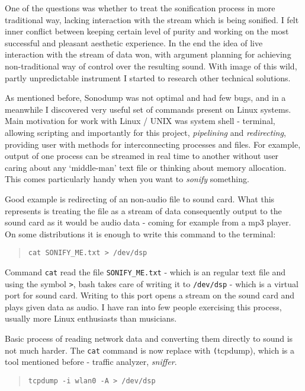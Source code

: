 \documentclass[11pt,a4paper,oneside]{report}
\begin{document}
One of the questions was whether to treat the sonification process in more traditional way, lacking interaction with the stream which is being sonified. I felt inner conflict between keeping certain level of purity and working on the most successful and pleasant aesthetic experience. In the end the idea of live interaction with the stream of data won, with argument planning for achieving non-traditional way of control over the resulting sound. With image of this wild, partly unpredictable instrument I started to research other technical solutions.

As mentioned before, Sonodump was not optimal and had few bugs, and in a meanwhile I discovered very useful set of commands present on Linux systems. Main motivation for work with Linux / UNIX was system shell - terminal, allowing scripting and importantly for this project, \emph{pipelining} and \emph{redirecting}, providing user with methods for interconnecting processes and files. For example, output of one process can be streamed in real time to another without user caring about any `middle-man' text file or thinking about memory allocation. This comes particularly handy when you want to \emph{sonify} something. 

Good example is redirecting of an non-audio file to sound card. What this represents is treating the file as a stream of data consequently output to the sound card as it would be audio data - coming for example from a mp3 player. On some distributions it is enough to write this command to the terminal:
\begin{quotation}
	\texttt{cat SONIFY\_ME.txt > /dev/dsp} 
\end{quotation}

Command \texttt{cat} read the file \texttt{SONIFY\_ME.txt} - which is an regular text file and using the symbol \texttt{>}, bash takes care of writing it to \texttt{/dev/dsp} - which is a virtual port for sound card. Writing to this port opens a stream on the sound card and plays given data as audio. I have ran into few people exercising this process, usually more Linux enthusiasts than musicians. 

Basic process of reading network data and converting them directly to sound is not much harder. The \texttt{cat} command is now replace with \texttt(tcpdump), which is a tool mentioned before - traffic analyzer, \emph{sniffer}.
\begin{quotation}
	\texttt{tcpdump -i wlan0 -A > /dev/dsp} 
\end{quotation}
\end{document}
